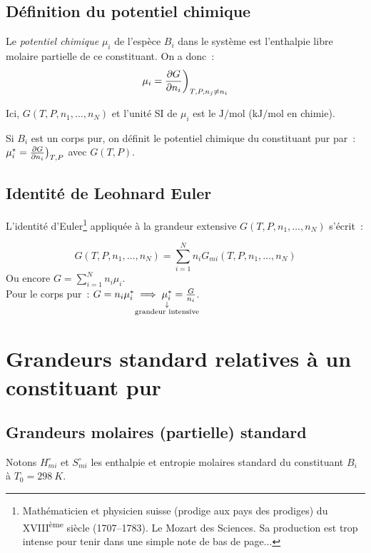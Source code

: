 \documentclass{article}
\newcommand{\ds}{\displaystyle}
\newcommand{\Tz}{T_0 = \SI{298}{K}}
\begin{document}

\subsection{Définition du potentiel chimique}
\begin{tableau}
    \begin{enonce}
        Le \textit{potentiel chimique} $\mu_i$ de l'espèce $B_i$ dans le système est l'enthalpie libre molaire partielle de ce constituant. On a donc~:
        $$\mu_i = \pdv{G}{n_i}\bigg)_{T,P,n_j\neq n_i}$$
    \end{enonce}
    Ici, $G(T,P,n_1,\dots,n_N)$ et l'unité SI de $\mu_i$ est le $\si{\joule\per\mole}$ ($\si{\kilo\joule\per\mole}$ en chimie).
    \begin{remarque}[Remarque]
        Si $B_i$ est un corps pur, on définit le potentiel chimique du constituant pur par~: $\mu_i^*=\pdv{G}{n_i}\big)_{T,P}$ avec $G(T,P)$.
    \end{remarque}
\end{tableau}

\subsection{Identité de Leohnard Euler}
L'identité d'Euler\footnote{Mathématicien et physicien suisse (prodige aux pays des prodiges) du XVIII\textsuperscript{ème} siècle (1707--1783). Le Mozart des Sciences. Sa production est trop intense pour tenir dans une simple note de bas de page...} appliquée à la grandeur extensive $G(T,P,n_1,\dots,n_N)$ s'écrit~:
\begin{tableau}
    $$G(T,P,n_1,\dots,n_N) = \sum_{i=1}^N n_i G_{mi}(T,P,n_1,\dots,n_N)$$
    Ou encore $G=\ds\sum_{i=1}^N n_i\mu_i$.\\
    
    Pour le corps pur~: $G=n_i\mu_i^* \implies \underset{\mathclap{\substack{\downarrow\\\text{grandeur intensive}}}}{\mu_i^*} = \frac{G}{n_i}$.
\end{tableau}

\section{Grandeurs standard relatives à un constituant pur}
\subsection{Grandeurs molaires (partielle) standard}
Notons $H_{mi}^\circ$ et $S_{mi}^\circ$ les enthalpie et entropie molaires standard du constituant $B_i$ à $\Tz$.
\end{document}
